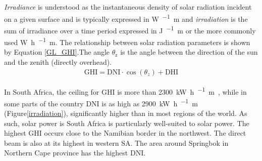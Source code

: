 \emph{Irradiance} is understood as the instantaneous density of solar radiation incident on a given surface and is typically expressed in \si{\watt\per\squared\metre} and \emph{irradiation} is the sum of irradiance over a time period expressed in \si{\joule\per\squared\metre} or the more commonly used \si{\watt\hour\per\squared\metre}. The relationship between solar radiation parameters is shown by Equation \ref{GL_GHI}.The angle $\theta_\text{z}$ is the angle between the direction of the sun and the zenith (directly overhead).
\begin{align}
\text{GHI}=\text{DNI}\cdot\cos(\theta_{z})+\text{DHI}\label{GL_GHI}
\end{align}

In South Africa, the ceiling for GHI is more than \SI{2300}{\kilo\watt\hour\per\squared\metre\year}, while in some parts of the country DNI is as high as \SI{2900}{\kilo\watt\hour\per\squared\metre\year} (Figure\ref{irradiation}), significantly higher than in most regions of the world. As such, solar power is South Africa is particularly well-suited to solar power. The highest GHI occurs close to the Namibian border in the northwest. The direct beam is also at its highest in western SA. The area around Springbok in Northern Cape province has the highest DNI.

